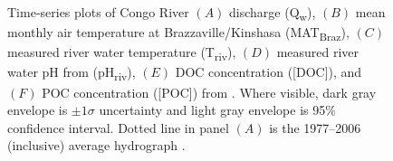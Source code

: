 \begin{figure}[p]
	\caption[Environmental parameter time-series plots]{Time-series plots of Congo River $(A)$ discharge (Q\textsubscript{w}), $(B)$ mean monthly air temperature at Brazzaville/Kinshasa (MAT\textsubscript{Braz}), $(C)$ measured river water temperature (T\textsubscript{riv}), $(D)$ measured river water pH from \citet{Wang:2013js} (pH\textsubscript{riv}), $(E)$ DOC concentration ([DOC]), and $(F)$ POC concentration ([POC]) from \citet{Hemingway:2016bq}. Where visible, dark gray envelope is $\pm 1 \sigma$ uncertainty and light gray envelope is 95\% confidence interval. Dotted line in panel $(A)$ is the 1977--2006 (inclusive) average hydrograph \citep{Spencer:2012en}.}
	\label{Ch5Fig:2} 
\end{figure}


